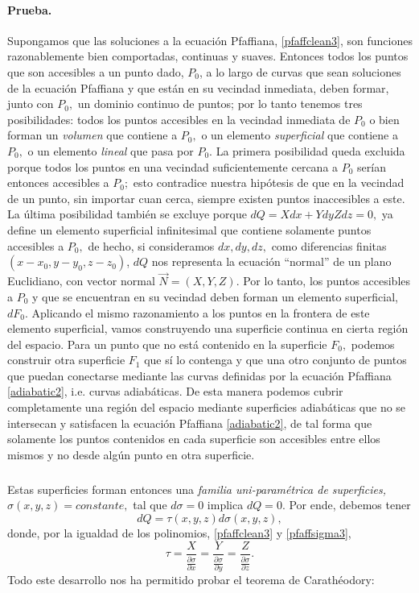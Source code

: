 \documentclass{article}
\theoremstyle{definition} \newtheorem{defi}{Definici\'on}
\theoremstyle{definition} \newtheorem{teo}{Teorema}
\theoremstyle{definition} \newtheorem{cor}{Corolario}
\begin{document}
\paragraph{Prueba.}
Supongamos que las soluciones a la ecuaci\'on Pfaffiana, \eqref{pfaffclean3}, son funciones razonablemente bien comportadas, continuas y suaves. Entonces todos los puntos que son accesibles a un punto dado, $P_0$, a lo largo de curvas que sean soluciones de la ecuaci\'on Pfaffiana y que est\'an en su vecindad inmediata, deben formar, junto con $P_0,$ un dominio continuo de puntos; por lo tanto tenemos tres posibilidades: todos los puntos accesibles en la vecindad inmediata de $P_0$ o bien forman un \emph{volumen} que contiene a $P_0,$ o un elemento \emph{superficial} que contiene a $P_0,$ o un elemento \emph{lineal} que pasa por $P_0.$ La primera posibilidad queda excluida porque todos los puntos en una vecindad suficientemente cercana a $P_0$ ser\'ian entonces accesibles a $P_0;$ esto contradice nuestra hip\'otesis de que en la vecindad de un punto, sin importar cuan cerca, siempre existen puntos inaccesibles a este. La \'ultima posibilidad tambi\'en se excluye porque $dQ = X dx + Y dy Z dz = 0,$ ya define un elemento superficial infinitesimal que contiene solamente puntos accesibles a $P_0,$ de hecho, si consideramos $dx,dy,dz,$ como diferencias finitas $(x-x_0,y-y_0,z-z_0)$, $dQ$ nos representa la ecuaci\'on ``normal'' de un plano Euclidiano, con vector normal $\vec N = (X,Y,Z).$ Por lo tanto, los puntos accesibles a $P_0$ y que se encuentran en su vecindad deben forman un elemento superficial, $dF_0.$ Aplicando el mismo razonamiento a los puntos en la frontera de este elemento superficial, vamos construyendo una superficie continua en cierta regi\'on del espacio. Para un punto que no est\'a contenido en la superficie $F_0,$ podemos construir otra superficie $F_1$ que s\'i lo contenga y que una otro conjunto de puntos que puedan conectarse mediante las curvas definidas por la ecuaci\'on Pfaffiana \eqref{adiabatic2}, i.e. curvas adiab\'aticas. De esta manera podemos cubrir completamente una regi\'on del espacio mediante superficies adiab\'aticas que no se intersecan y satisfacen la ecuaci\'on Pfaffiana \eqref{adiabatic2}, de tal forma que solamente los puntos contenidos en cada superficie son accesibles entre ellos mismos y no desde alg\'un punto en otra superficie.
\subparagraph{}
Estas superficies forman entonces una \emph{familia uni-param\'etrica de superficies,} $\sigma(x, y, z) = constante,$ tal que $d\sigma = 0$ implica $dQ = 0.$ Por ende, debemos tener
\begin{equation}\label{calortau}
dQ = \tau(x, y, z)d\sigma(x, y, z),
\end{equation}
donde, por la igualdad de los polinomios, \eqref{pfaffclean3} y \eqref{pfaffsigma3},
\begin{equation}
\tau = \frac{X}{\frac{\partial \sigma}{\partial x}} = \frac{Y}{\frac{\partial \sigma}{\partial y}} = \frac{Z}{\frac{\partial \sigma}{\partial z}}.
\end{equation}
Todo este desarrollo nos ha permitido probar el teorema de Carath\'eodory:
\end{document}
